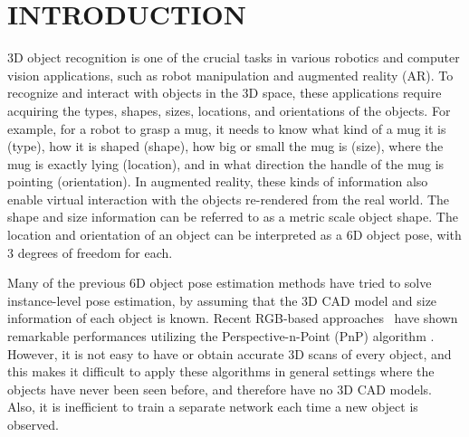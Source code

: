 \documentclass[letterpaper, 10 pt, journal, twoside]{IEEEtran}
\begin{document}
\section{INTRODUCTION}
\label{introduction}
3D object recognition is one of the crucial tasks in various robotics and computer vision applications, such as robot manipulation and augmented reality (AR).
To recognize and interact with objects in the 3D space, these applications require acquiring the types, shapes, sizes, locations, and orientations of the objects.
For example, for a robot to grasp a mug, it needs to know what kind of a mug it is (type), how it is shaped (shape), how big or small the mug is (size), where the mug is exactly lying (location), and in what direction the handle of the mug is pointing (orientation).
In augmented reality, these kinds of information also enable virtual interaction with the objects re-rendered from the real world.
The shape and size information can be referred to as a metric scale object shape.
The location and orientation of an object can be interpreted as a 6D object pose, with 3 degrees of freedom for each.


Many of the previous 6D object pose estimation methods have tried to solve instance-level pose estimation, by assuming that the 3D CAD model and size information of each object is known.
Recent RGB-based approaches~\cite{peng2019pvnet, tekin2018real_indirect} have shown remarkable performances utilizing the Perspective-n-Point (PnP) algorithm \cite{lepetit2009epnp}.
However, it is not easy to have or obtain accurate 3D scans of every object, and this makes it difficult to apply these algorithms in general settings where the objects have never been seen before, and therefore have no 3D CAD models.
Also, it is inefficient to train a separate network each time a new object is observed.
\end{document}
